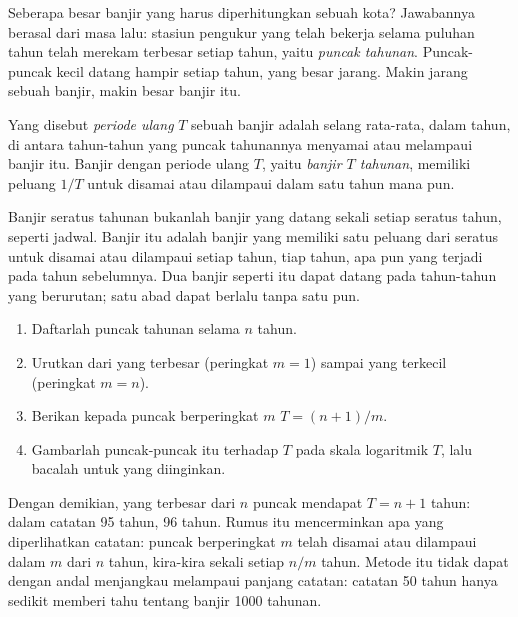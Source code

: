 Seberapa besar banjir yang harus diperhitungkan sebuah kota? Jawabannya
berasal dari masa lalu: stasiun pengukur  yang telah bekerja selama
puluhan tahun telah merekam  terbesar setiap tahun, yaitu \emph{puncak
tahunan}. Puncak-puncak kecil datang hampir setiap tahun, yang besar jarang.
Makin jarang sebuah banjir, makin besar banjir itu.

\begin{definition}\label{def:g10:drainage-basins:return-period}
Yang disebut \emph{periode ulang} $T$ sebuah banjir
adalah selang rata-rata, dalam tahun, di antara tahun-tahun yang puncak
tahunannya menyamai atau melampaui banjir itu. Banjir dengan periode ulang
$T$, yaitu \emph{banjir $T$ tahunan}, memiliki peluang $1/T$ untuk disamai
atau dilampaui dalam satu tahun mana pun.
\end{definition}

Banjir seratus tahunan bukanlah banjir yang datang sekali setiap seratus
tahun, seperti jadwal. Banjir itu adalah banjir yang memiliki satu peluang
dari seratus untuk disamai atau dilampaui setiap tahun, tiap tahun, apa pun
yang terjadi pada tahun sebelumnya. Dua banjir seperti itu dapat datang pada
tahun-tahun yang berurutan; satu abad dapat berlalu tanpa satu pun.

\begin{method}\label{met:g10:drainage-basins:return-periods}
\begin{enumerate}
  \item Daftarlah puncak tahunan selama $n$ tahun.
  \item Urutkan dari yang terbesar (peringkat $m = 1$) sampai yang terkecil
        (peringkat $m = n$).
  \item Berikan kepada puncak berperingkat $m$  $T = (n + 1)/m$.
  \item Gambarlah puncak-puncak itu terhadap $T$ pada skala logaritmik $T$,
        lalu bacalah  untuk  yang diinginkan.
\end{enumerate}
\end{method}

Dengan demikian, yang terbesar dari $n$ puncak mendapat $T = n + 1$ tahun:
dalam catatan \num{95} tahun, \num{96} tahun. Rumus itu mencerminkan apa yang
diperlihatkan catatan: puncak berperingkat $m$ telah disamai atau dilampaui
dalam $m$ dari $n$ tahun, kira-kira sekali setiap $n/m$ tahun. Metode itu
tidak dapat dengan andal menjangkau melampaui panjang catatan: catatan
\num{50} tahun hanya sedikit memberi tahu tentang banjir \num{1000} tahunan.

